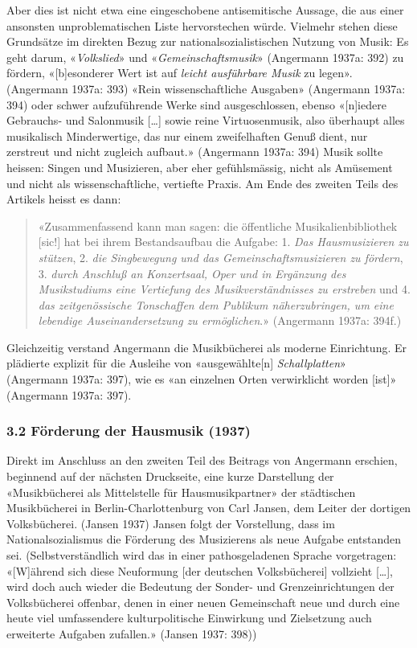 \documentclass[a4paper,
fontsize=11pt,
oneside,
numbers=noperiodatend,
parskip=half-,
bibliography=totoc,
final
]{scrartcl}
\begin{document}
Aber dies ist nicht etwa eine eingeschobene antisemitische Aussage, die
aus einer ansonsten unproblematischen Liste hervorstechen würde.
Vielmehr stehen diese Grundsätze im direkten Bezug zur
nationalsozialistischen Nutzung von Musik: Es geht darum,
«\emph{Volkslied}» und «\emph{Gemeinschaftsmusik}» (Angermann 1937a:
392) zu fördern, «{[}b{]}esonderer Wert ist auf \emph{leicht ausführbare
Musik} zu legen». (Angermann 1937a: 393) «Rein wissenschaftliche
Ausgaben» (Angermann 1937a: 394) oder schwer aufzuführende Werke sind
ausgeschlossen, ebenso «{[}n{]}iedere Gebrauchs- und Salonmusik
{[}\ldots{]} sowie reine Virtuosenmusik, also überhaupt alles
musikalisch Minderwertige, das nur einem zweifelhaften Genuß dient, nur
zerstreut und nicht zugleich aufbaut.» (Angermann 1937a: 394) Musik
sollte heissen: Singen und Musizieren, aber eher gefühlsmässig, nicht
als Amüsement und nicht als wissenschaftliche, vertiefte Praxis. Am Ende
des zweiten Teils des Artikels heisst es dann:

\begin{quote}
«Zusammenfassend kann man sagen: die öffentliche Musikalienbibliothek
{[}sic!{]} hat bei ihrem Bestandsaufbau die Aufgabe: 1. \emph{Das
Hausmusizieren zu stützen}, 2. \emph{die Singbewegung und das
Gemeinschaftsmusizieren zu fördern}, 3. \emph{durch Anschluß an
Konzertsaal, Oper und in Ergänzung des Musikstudiums eine Vertiefung des
Musikverständnisses zu erstreben} und 4. \emph{das zeitgenössische
Tonschaffen dem Publikum näherzubringen, um eine lebendige
Auseinandersetzung zu ermöglichen}.» (Angermann 1937a: 394f.)
\end{quote}

Gleichzeitig verstand Angermann die Musikbücherei als moderne
Einrichtung. Er plädierte explizit für die Ausleihe von
«ausgewählte{[}n{]} \emph{Schallplatten}» (Angermann 1937a: 397), wie es
«an einzelnen Orten verwirklicht worden {[}ist{]}» (Angermann 1937a:
397).

\hypertarget{fuxf6rderung-der-hausmusik-1937}{%
\subsubsection{3.2 Förderung der Hausmusik
(1937)}\label{fuxf6rderung-der-hausmusik-1937}}

Direkt im Anschluss an den zweiten Teil des Beitrags von Angermann
erschien, beginnend auf der nächsten Druckseite, eine kurze Darstellung
der «Musikbücherei als Mittelstelle für Hausmusikpartner» der
städtischen Musikbücherei in Berlin-Charlottenburg von Carl Jansen, dem
Leiter der dortigen Volksbücherei. (Jansen 1937) Jansen folgt der
Vorstellung, dass im Nationalsozialismus die Förderung des Musizierens
als neue Aufgabe entstanden sei. (Selbstverständlich wird das in einer
pathosgeladenen Sprache vorgetragen: «{[}W{]}ährend sich diese
Neuformung {[}der deutschen Volksbücherei{]} vollzieht {[}\ldots{]},
wird doch auch wieder die Bedeutung der Sonder- und Grenzeinrichtungen
der Volksbücherei offenbar, denen in einer neuen Gemeinschaft neue und
durch eine heute viel umfassendere kulturpolitische Einwirkung und
Zielsetzung auch erweiterte Aufgaben zufallen.» (Jansen 1937: 398))
\end{document}
